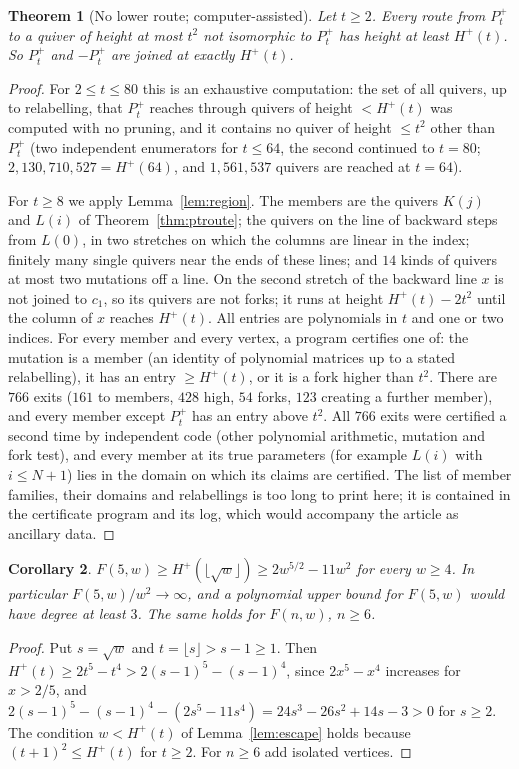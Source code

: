 \documentclass[11pt]{amsart}
\newtheorem{theorem}{Theorem}[section]
\newtheorem{corollary}[theorem]{Corollary}
\theoremstyle{definition}
\theoremstyle{remark}
\begin{document}
\begin{theorem}[No lower route; computer-assisted]\label{thm:ptlower}
Let $t\ge2$. Every route from $P^+_t$ to a quiver of height at most $t^2$ not isomorphic to $P^+_t$ has height at least $H^+(t)$. So $P^+_t$ and $-P^+_t$ are joined at exactly $H^+(t)$.
\end{theorem}
\begin{proof}
For $2\le t\le80$ this is an exhaustive computation: the set of all quivers, up to relabelling, that $P^+_t$ reaches through quivers of height $<H^+(t)$ was computed with no pruning, and it contains no quiver of height $\le t^2$ other than $P^+_t$ (two independent enumerators for $t\le64$, the second continued to $t=80$; $2{,}130{,}710{,}527=H^+(64)$, and $1{,}561{,}537$ quivers are reached at $t=64$).

For $t\ge8$ we apply Lemma~\ref{lem:region}. The members are the quivers $K(j)$ and $L(i)$ of Theorem~\ref{thm:ptroute}; the quivers on the line of backward steps from $L(0)$, in two stretches on which the columns are linear in the index; finitely many single quivers near the ends of these lines; and $14$ kinds of quivers at most two mutations off a line. On the second stretch of the backward line $x$ is not joined to $c_1$, so its quivers are not forks; it runs at height $H^+(t)-2t^2$ until the column of $x$ reaches $H^+(t)$. All entries are polynomials in $t$ and one or two indices. For every member and every vertex, a program certifies one of: the mutation is a member (an identity of polynomial matrices up to a stated relabelling), it has an entry $\ge H^+(t)$, or it is a fork higher than $t^2$. There are $766$ exits ($161$ to members, $428$ high, $54$ forks, $123$ creating a further member), and every member except $P^+_t$ has an entry above $t^2$. All $766$ exits were certified a second time by independent code (other polynomial arithmetic, mutation and fork test), and every member at its true parameters (for example $L(i)$ with $i\le N+1$) lies in the domain on which its claims are certified. The list of member families, their domains and relabellings is too long to print here; it is contained in the certificate program and its log, which would accompany the article as ancillary data.
\end{proof}

\begin{corollary}\label{cor:pt}
$F(5,w)\ge H^+(\lfloor\sqrt w\rfloor)\ge2w^{5/2}-11w^2$ for every $w\ge4$. In particular $F(5,w)/w^2\to\infty$, and a polynomial upper bound for $F(5,w)$ would have degree at least $3$. The same holds for $F(n,w)$, $n\ge6$.
\end{corollary}
\begin{proof}
Put $s=\sqrt w$ and $t=\lfloor s\rfloor>s-1\ge1$. Then $H^+(t)\ge2t^5-t^4>2(s-1)^5-(s-1)^4$, since $2x^5-x^4$ increases for $x>2/5$, and $2(s-1)^5-(s-1)^4-(2s^5-11s^4)=24s^3-26s^2+14s-3>0$ for $s\ge2$. The condition $w<H^+(t)$ of Lemma~\ref{lem:escape} holds because $(t+1)^2\le H^+(t)$ for $t\ge2$. For $n\ge6$ add isolated vertices.
\end{proof}
\end{document}
